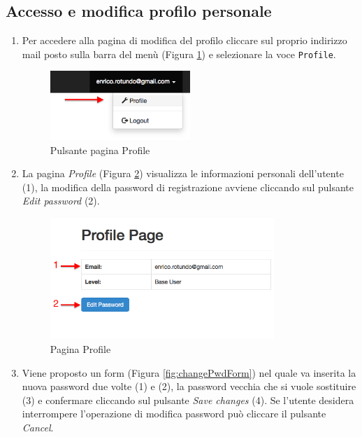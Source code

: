 	\clearpage
	\subsection{Accesso e modifica profilo personale}
		\label{modificaprofilo}
		\begin{enumerate}

			\item Per accedere alla pagina di modifica del profilo cliccare sul proprio indirizzo mail posto sulla barra del menù (Figura \ref{fig:profileButton}) e selezionare la voce \texttt{Profile}.

			\begin{figure}[H]
				\centering \includegraphics[width=0.5\textwidth]{img/profileButton.png}
			\caption{ \label{fig:profileButton} Pulsante pagina Profile}
			\end{figure}

			\item La pagina \emph{Profile} (Figura \ref{fig:showProfile}) visualizza le informazioni personali dell'utente (1), la modifica della password di registrazione avviene cliccando sul pulsante \emph{Edit password} (2).

			\begin{figure}[H]
				\centering \includegraphics[width=0.8\textwidth]{img/showProfile.png}
			\caption{ \label{fig:showProfile} Pagina Profile}
			\end{figure}

			\item Viene proposto un form (Figura \ref{fig:changePwdForm}) nel quale va inserita la nuova password due volte (1) e (2), la password vecchia che si vuole sostituire (3) e confermare cliccando sul pulsante \emph{Save changes} (4). Se l'utente desidera interrompere l'operazione di modifica password può cliccare il pulsante \emph{Cancel}.


\end{enumerate}
